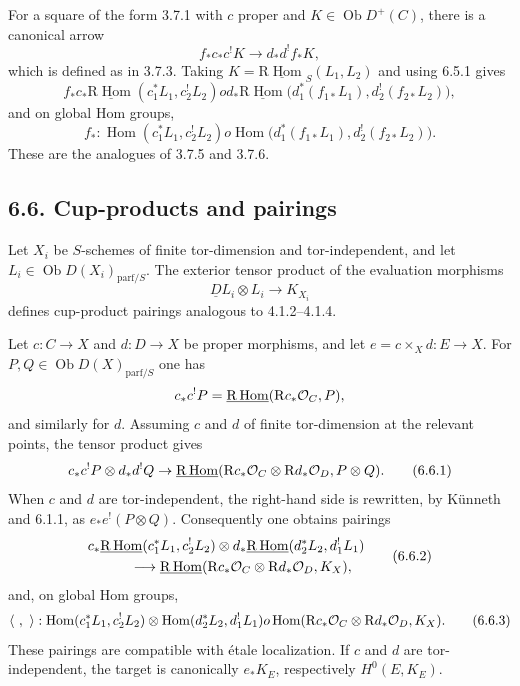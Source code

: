 \documentclass[11pt]{article}
\theoremstyle{plain}
\theoremstyle{definition}
\theoremstyle{remark}
\DeclareMathOperator{\Hom}{Hom}
\DeclareMathOperator{\ob}{Ob}
\newcommand{\R}{\mathrm R}
\begin{document}
For a square of the form 3.7.1 with $c$ proper and $K\in\ob D^+(C)$, there is a canonical arrow
\begin{equation}
   f_*c_*c^!K\to d_*d^!f_*K,
   \tag{6.5.3}
\end{equation}
which is defined as in 3.7.3. Taking $K=\underline{\R\Hom}_S(L_1,L_2)$ and using 6.5.1 gives
\begin{equation}
   f_*c_*\underline{\R\Hom}(c_1^*L_1,c_2^!L_2)	o
   d_*\underline{\R\Hom}\bigl(d_1^*(f_{1*}L_1),d_2^!(f_{2*}L_2)\bigr),
   \tag{6.5.4}
\end{equation}
and on global Hom groups,
\begin{equation}
   f_*:\Hom(c_1^*L_1,c_2^!L_2)	o
   \Hom\bigl(d_1^*(f_{1*}L_1),d_2^!(f_{2*}L_2)\bigr).
   \tag{6.5.5}
\end{equation}
These are the analogues of 3.7.5 and 3.7.6.

\subsection*{6.6. Cup-products and pairings}
Let $X_i$ be $S$-schemes of finite tor-dimension and tor-independent, and let $L_i\in\ob D(X_i)_{\mathrm{parf}/S}$. The exterior tensor product of the evaluation morphisms
\[
   \underline{D}L_i\otimes L_i\to K_{X_i}
\]
defines cup-product pairings analogous to 4.1.2--4.1.4.

Let $c:C\to X$ and $d:D\to X$ be proper morphisms, and let $e=c\times_X d:E\to X$. For $P,Q\in\ob D(X)_{\mathrm{parf}/S}$ one has
\[
   c_*c^!P=\underline{\R\Hom}(\R c_*\cO_C,P),
\]
and similarly for $d$. Assuming $c$ and $d$ of finite tor-dimension at the relevant points, the tensor product gives
\begin{equation}
   c_*c^!P\otimes d_*d^!Q
   \to
   \underline{\R\Hom}(\R c_*\cO_C\otimes \R d_*\cO_D,P\otimes Q).
   \tag{6.6.1}
\end{equation}
When $c$ and $d$ are tor-independent, the right-hand side is rewritten, by Künneth and 6.1.1, as $e_*e^!(P\otimes Q)$. Consequently one obtains pairings
\begin{equation}
\begin{split}
 &c_*\underline{\R\Hom}(c_1^*L_1,c_2^!L_2)
 \otimes d_*\underline{\R\Hom}(d_2^*L_2,d_1^!L_1)\\
 &\hspace{3em}\longrightarrow
 \underline{\R\Hom}(\R c_*\cO_C\otimes \R d_*\cO_D,K_X),
\end{split}
\tag{6.6.2}
\end{equation}
and, on global Hom groups,
\begin{equation}
   \langle\ ,\ \rangle:
   \Hom(c_1^*L_1,c_2^!L_2)\otimes
   \Hom(d_2^*L_2,d_1^!L_1)	o
   \Hom(\R c_*\cO_C\otimes \R d_*\cO_D,K_X).
   \tag{6.6.3}
\end{equation}
These pairings are compatible with étale localization. If $c$ and $d$ are tor-independent, the target is canonically $e_*K_E$, respectively $H^0(E,K_E)$.
\end{document}
